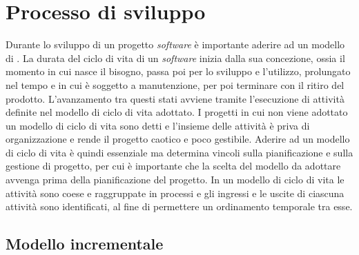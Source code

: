 
\chapter{Processo di sviluppo}
\label{cap:processi-metodologie}

Durante lo sviluppo di un progetto \textit{software} è importante aderire ad un modello di . La durata del ciclo di vita di un \textit{software} inizia dalla sua concezione, ossia il momento in cui nasce il bisogno, passa poi per lo sviluppo e l'utilizzo, prolungato nel tempo e in cui è soggetto a manutenzione, per poi terminare con il ritiro del prodotto. L'avanzamento tra questi stati avviene tramite l'esecuzione di attività definite nel modello di ciclo di vita adottato. I progetti in cui non viene adottato un modello di ciclo di vita sono detti  e l'insieme delle attività è priva di organizzazione e rende il progetto caotico e poco gestibile. Aderire ad un modello di ciclo di vita è quindi essenziale ma determina vincoli sulla pianificazione e sulla gestione di progetto, per cui è importante che la scelta del modello da adottare avvenga prima della pianificazione del progetto. In un modello di ciclo di vita le attività sono coese e raggruppate in processi e gli ingressi e le uscite di ciascuna attività sono identificati, al fine di permettere un ordinamento temporale tra esse.

\section{Modello incrementale}

